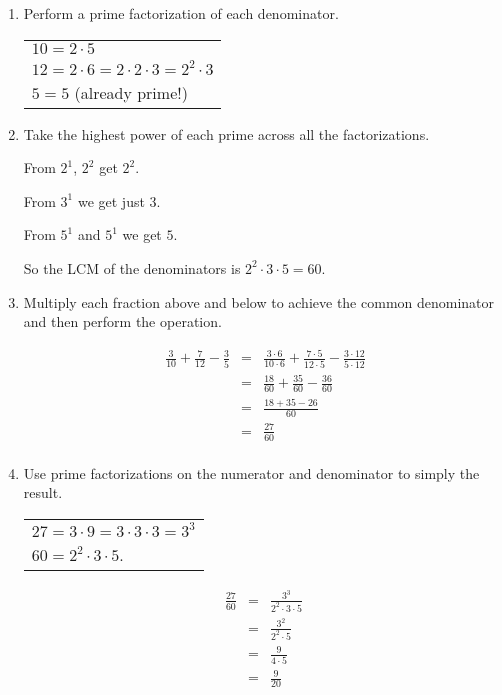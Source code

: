\documentclass[letterpaper,12pt,fleqn]{article}
\begin{document}
\begin{enumerate}
\item Perform a prime factorization of each denominator.

\begin{tabular}{l}
$10=2\cdot5$ \\
$12=2\cdot6=2\cdot2\cdot3=2^2\cdot3$ \\
$5=5$ (already prime!) \\
\end{tabular}

\item Take the highest power of each prime across all the factorizations.

From $2^1$, $2^2$ get $2^2$.

From $3^1$ we get just $3$.

From $5^1$ and $5^1$ we get $5$.

So the LCM of the denominators is $2^2\cdot3\cdot5=60$.

\item Multiply each fraction above and below to achieve the common
denominator and then perform the operation.

\begin{eqnarray*}\
\frac{3}{10}+\frac{7}{12}-\frac{3}{5} &=&
    \frac{3\cdot6}{10\cdot6}+\frac{7\cdot5}{12\cdot5}-
    \frac{3\cdot12}{5\cdot12} \\
&=& \frac{18}{60}+\frac{35}{60}-\frac{36}{60} \\
&=& \frac{18+35-26}{60} \\
&=& \frac{27}{60} \\
\end{eqnarray*}

\item Use prime factorizations on the numerator and denominator to simply the
result.

\begin{tabular}{l}
$27=3\cdot9=3\cdot3\cdot3=3^3$ \\
$60=2^2\cdot3\cdot5$.
\end{tabular}

\begin{eqnarray*}
\frac{27}{60} &=& \frac{3^3}{2^2\cdot3\cdot5} \\
              &=& \frac{3^2}{2^2\cdot5} \\
              &=& \frac{9}{4\cdot5} \\
              &=& \frac{9}{20} \\
\end{eqnarray*}
\end{enumerate}
\end{document}

